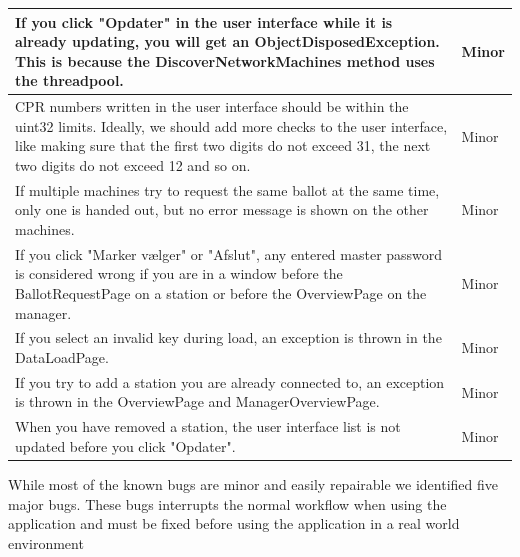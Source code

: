 \documentclass[a4paper]{report}
\begin{document}
\begin{longtable}{|p{\textwidth-20mm}|p{15mm}|}
\\\hline
If you click "Opdater" in the user interface while it is already updating, you will get an ObjectDisposedException. This is because the DiscoverNetworkMachines method uses the threadpool. & Minor

\\\hline
CPR numbers written in the user interface should be within the uint32 limits. Ideally, we should add more checks to the user interface, like making sure that the first two digits do not exceed 31, the next two digits do not exceed 12 and so on. & Minor

\\\hline
If multiple machines try to request the same ballot at the same time, only one is handed out, but no error message is shown on the other machines. & Minor

\\\hline
If you click "Marker v\ae lger" or "Afslut", any entered master password is considered wrong if you are in a window before the BallotRequestPage on a station or before the OverviewPage on the manager. & Minor

\\\hline
If you select an invalid key during load, an exception is thrown in the DataLoadPage. & Minor

\\\hline
If you try to add a station you are already connected to, an exception is thrown in the OverviewPage and ManagerOverviewPage. & Minor

\\\hline
When you have removed a station, the user interface list is not updated before you click "Opdater". & Minor

\\\hline
\end{longtable}

While most of the known bugs are minor and easily repairable we identified five major bugs. These bugs interrupts the normal workflow when using the application and must be fixed before using the application in a real world environment 
\end{document}
